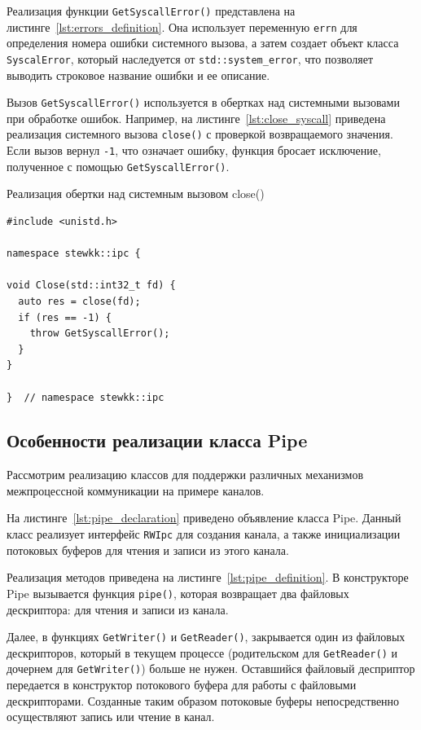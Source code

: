 \documentclass[14pt, russian]{scrartcl}
\begin{document}
Реализация функции \verb|GetSyscallError()| представлена на
листинге~\ref{lst:errors_definition}. Она использует переменную \verb|errn| для
определения номера ошибки системного вызова, а затем создает объект класса
\verb|SyscalError|, который наследуется от \verb|std::system_error|, что
позволяет выводить строковое название ошибки и ее описание.

Вызов \verb|GetSyscallError()| используется в обертках над системными вызовами
при обработке ошибок. Например, на листинге~\ref{lst:close_syscall} приведена
реализация системного вызова \verb|close()| с проверкой возвращаемого значения.
Если вызов вернул \verb|-1|, что означает ошибку, функция бросает исключение,
полученное с помощью \verb|GetSyscallError()|.

\begin{listing}[H]
  \caption{Реализация обертки над системным вызовом close()}
  \label{lst:close_syscall}
  \begin{verbatim}
#include <unistd.h>

namespace stewkk::ipc {

void Close(std::int32_t fd) {
  auto res = close(fd);
  if (res == -1) {
    throw GetSyscallError();
  }
}

}  // namespace stewkk::ipc
  \end{verbatim}
\end{listing}

\subsection{Особенности реализации класса Pipe}

Рассмотрим реализацию классов для поддержки различных механизмов межпроцессной
коммуникации на примере каналов.

На листинге~\ref{lst:pipe_declaration} приведено объявление класса Pipe. Данный
класс реализует интерфейс \verb|RWIpc| для создания канала, а также
инициализации потоковых буферов для чтения и записи из этого канала.

Реализация методов приведена на листинге~\ref{lst:pipe_definition}. В
конструкторе Pipe вызывается функция \verb|pipe()|, которая возвращает два
файловых дескриптора: для чтения и записи из канала.

Далее, в функциях \verb|GetWriter()| и \verb|GetReader()|, закрывается один из
файловых дескрипторов, который в текущем процессе (родительском для
\verb|GetReader()| и дочернем для \verb|GetWriter()|) больше не нужен.
Оставшийся файловый десприптор передается в конструктор потокового буфера для
работы с файловыми дескрипторами. Созданные таким образом потоковые буферы
непосредственно осуществляют запись или чтение в канал.
\end{document}
